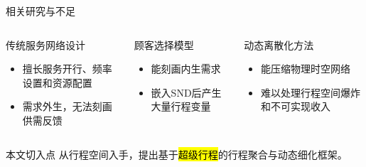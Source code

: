 \begin{frame}{相关研究与不足}
\begin{columns}[T,totalwidth=\textwidth]
\begin{block}{传统服务网络设计}
\small
\begin{itemize}
    \item 擅长服务开行、频率设置和资源配置
    \item 需求外生，无法刻画供需反馈
\end{itemize}
\end{block}

\begin{block}{顾客选择模型}
\small
\begin{itemize}
    \item 能刻画内生需求
    \item 嵌入SND后产生大量行程变量
\end{itemize}
\end{block}

\begin{block}{动态离散化方法}
\small
\begin{itemize}
    \item 能压缩物理时空网络
    \item 难以处理行程空间爆炸和不可实现收入
\end{itemize}
\end{block}
\end{columns}

\vspace{0.4cm}
\begin{alertblock}{\centering 本文切入点}
\centering
从行程空间入手，提出基于\hl{超级行程}的行程聚合与动态细化框架。
\end{alertblock}
\end{frame}


